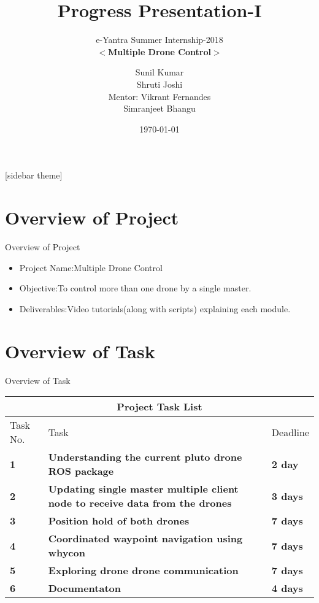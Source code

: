 \documentclass[10pt, a4paper]{beamer}
\begin{document}
	\title{Progress Presentation-I}
	\subtitle{e-Yantra Summer Internship-2018 \\ $<$\textbf{Multiple Drone Control}$>$}
	\author{Sunil Kumar\\Shruti Joshi\\
	Mentor: Vikrant Fernandes\\Simranjeet Bhangu}
	\date{\today}
	\frame{\titlepage}

[sidebar theme]
\section{Overview of Project}
\begin{frame}{Overview of Project}
	
	\begin{itemize}
		\item Project Name:Multiple Drone Control
		\item Objective:To control more than one drone by a single master.
		\item Deliverables:Video tutorials(along with scripts) explaining each module.
	\end{itemize}
\end{frame}

\section{Overview of Task}
\begin{frame}{Overview of Task}
        \begin{center}

\begin{tabular}{ |p{1cm}||p{6.8cm}|p{1.3cm}| }
 \hline
 \multicolumn{3}{|c|}{Project Task List} \\
 \hline
 Task No. & \centering Task & Deadline\\
 \hline
 \textbf{1}& \textbf{Understanding the current pluto drone ROS package}  & \textbf{2 day}\\
 \hline
 \textbf{2}&   \textbf{Updating single master multiple client node to receive data from the drones} & \textbf{3 days} \\
 \hline
 \textbf{3} & \textbf{Position hold of both drones} & \textbf{7 days}\\
 \hline
 \textbf{4} & \textbf{Coordinated waypoint navigation using whycon} & \textbf{7 days}\\
 \hline
\textbf{ 5} &  \textbf{Exploring drone drone communication}  & \textbf{7 days}\\
 \hline
\textbf{ 6} & \textbf{Documentaton}  & \textbf{ 4 days}  \\

 \hline
\end{tabular}
 
\end{center}

 \end{frame}
\end{document}
